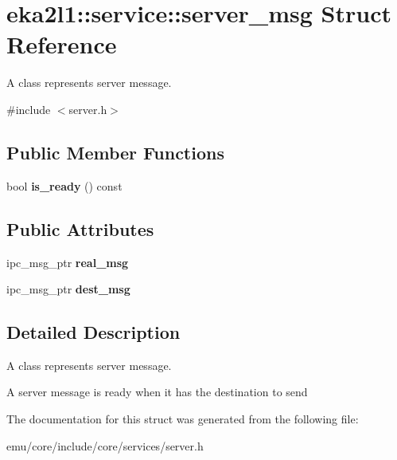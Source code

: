 \hypertarget{structeka2l1_1_1service_1_1server__msg}{}\section{eka2l1\+:\+:service\+:\+:server\+\_\+msg Struct Reference}
\label{structeka2l1_1_1service_1_1server__msg}


A class represents server message.  




{\ttfamily \#include $<$server.\+h$>$}

\subsection*{Public Member Functions}
\begin{DoxyCompactItemize}
\item 
\mbox{\label{structeka2l1_1_1service_1_1server__msg_af5969e66ca4b142da758b2646a0d4e2f}} 
bool {\bfseries is\+\_\+ready} () const
\end{DoxyCompactItemize}
\subsection*{Public Attributes}
\begin{DoxyCompactItemize}
\item 
\mbox{\label{structeka2l1_1_1service_1_1server__msg_a6fea475ed3aba9d2cdaf6fdd7704df18}} 
ipc\+\_\+msg\+\_\+ptr {\bfseries real\+\_\+msg}
\item 
\mbox{\label{structeka2l1_1_1service_1_1server__msg_a2c52c82a66bbb390aac3acf53c085da8}} 
ipc\+\_\+msg\+\_\+ptr {\bfseries dest\+\_\+msg}
\end{DoxyCompactItemize}


\subsection{Detailed Description}
A class represents server message. 

A server message is ready when it has the destination to send 

The documentation for this struct was generated from the following file\+:\begin{DoxyCompactItemize}
\item 
emu/core/include/core/services/server.\+h\end{DoxyCompactItemize}
